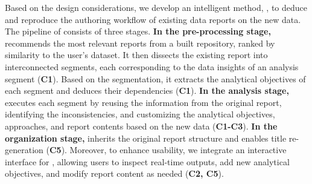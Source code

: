 Based on the design considerations, we develop an intelligent method, \system{}, to deduce and reproduce the authoring workflow of existing data reports on the new data. 
The pipeline of \system{} consists of three stages. 
\textbf{In the pre-processing stage,} \system{} recommends the most relevant reports from a built repository, ranked by similarity to the user's dataset. 
It then dissects the existing report into interconnected segments, each corresponding to the data insights of an analysis segment (\textbf{C1}). 
Based on the segmentation, it extracts the analytical objectives of each segment and deduces their dependencies (\textbf{C1}). 
\textbf{In the analysis stage,} \system{} executes each segment by reusing the information from the original report, identifying the inconsistencies, and customizing the analytical objectives, approaches, and report contents based on the new data (\textbf{C1-C3}). 
\textbf{In the organization stage,} \system{} inherits the original report structure and enables title re-generation (\textbf{C5}). 
Moreover, to enhance usability, we integrate an interactive interface for \system{}, allowing users to inspect real-time outputs, add new analytical objectives, and modify report content as needed (\textbf{C2, C5}). 


